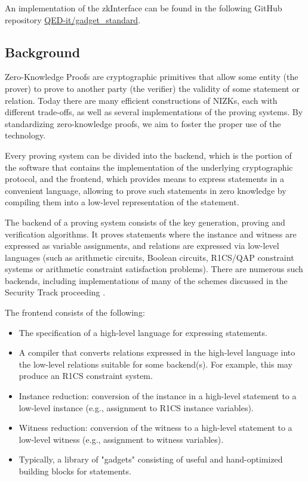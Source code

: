 \documentclass[a4paper,12pt]{article}
\begin{document}
An implementation of the zkInterface \cite{zkinterface} can be found in the following GitHub repository \href{https://github.com/QED-it/gadget_standard}{QED-it/gadget\_standard}.
\subsection{Background}

Zero-Knowledge Proofs are cryptographic primitives that allow some entity (the prover) to prove to another party (the verifier) the validity of some statement or relation. Today there are many efficient constructions of NIZKs, each with different trade-offs, as well as several implementations of the proving systems. By standardizing zero-knowledge proofs, we aim to foster the proper use of the technology.

Every proving system can be divided \cite{ZKProofImplementation} into the backend, which is the portion of the software that contains the implementation of the underlying cryptographic protocol, and the frontend, which provides means to express statements in a convenient language, allowing to prove such statements in zero knowledge by compiling them into a low-level representation of the statement.

The backend of a proving system consists of the key generation, proving and verification algorithms. It proves statements where the instance and witness are expressed as variable assignments, and relations are expressed via low-level languages (such as arithmetic circuits, Boolean circuits, R1CS/QAP constraint systems or arithmetic constraint satisfaction problems). There are numerous such backends, including implementations of many of the schemes discussed in the Security Track proceeding \cite{ZKProofSecurity}.

The frontend consists of the following:
\begin{itemize}
	\item The specification of a high-level language for expressing statements.
	\item A compiler that converts relations expressed in the high-level language into the low-level relations suitable for some backend(s). For example, this may produce an R1CS constraint system.
	\item Instance reduction: conversion of the instance in a high-level statement to a low-level instance (e.g., assignment to R1CS instance variables).
	\item Witness reduction: conversion of the witness to a high-level statement to a low-level witness (e.g., assignment to witness variables).
	\item Typically, a library of "gadgets" consisting of useful and hand-optimized building blocks for statements.
\end{itemize}
\end{document}
